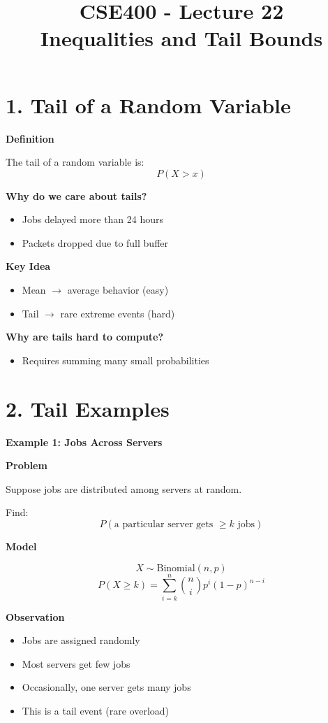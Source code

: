 \documentclass[12pt]{article}
\begin{document}
\title{\textbf{CSE400 - Lecture 22} \\ \Large Inequalities and Tail Bounds}
\author{}
\date{}

\maketitle

\section*{1. Tail of a Random Variable}

\textbf{Definition}

The tail of a random variable is:
\[
P(X > x)
\]

\textbf{Why do we care about tails?}
\begin{itemize}
\item Jobs delayed more than 24 hours
\item Packets dropped due to full buffer
\end{itemize}

\textbf{Key Idea}
\begin{itemize}
\item Mean $\rightarrow$ average behavior (easy)
\item Tail $\rightarrow$ rare extreme events (hard)
\end{itemize}

\textbf{Why are tails hard to compute?}
\begin{itemize}
\item Requires summing many small probabilities
\end{itemize}

\section*{2. Tail Examples}

\textbf{Example 1: Jobs Across Servers}

\textbf{Problem}

Suppose jobs are distributed among servers at random.

Find:
\[
P(\text{a particular server gets } \geq k \text{ jobs})
\]

\textbf{Model}

\[
X \sim \text{Binomial}(n,p)
\]
\[
P(X \geq k) = \sum_{i=k}^{n} \binom{n}{i} p^i (1-p)^{n-i}
\]

\textbf{Observation}
\begin{itemize}
\item Jobs are assigned randomly
\item Most servers get few jobs
\item Occasionally, one server gets many jobs
\item This is a tail event (rare overload)
\end{itemize}
\end{document}
